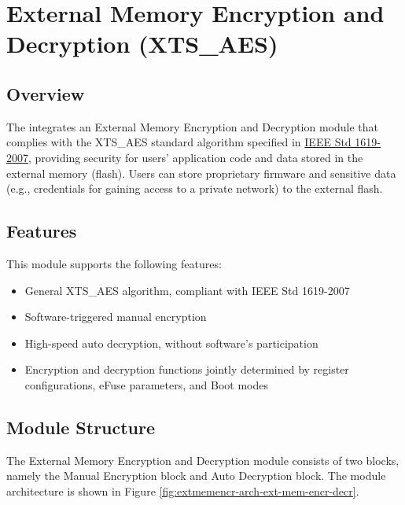 \documentclass[main\_\_EN.tex]{subfiles}
\begin{document}

\ifglobal
\else
    {\let\clearpage\relax \listoftodos}
    {\let\clearpage\relax \listofdonetodos}
    \tableofcontents
\fi



\hypertarget{extmemencr}{}
\chapter{External Memory Encryption and Decryption (XTS\_AES)}
\label{mod:extmemencr}

\section{Overview}

The \chipname{} integrates an External Memory Encryption and Decryption module that complies with the XTS\_AES standard algorithm specified in \href{https://ieeexplore.ieee.org/document/4493450}{IEEE Std 1619-2007}, providing security for users' application code and data stored in the external memory (flash). Users can store proprietary firmware and sensitive data (e.g., credentials for gaining access to a private network) to the external flash.

\section{Features}

This module supports the following features:

\begin{itemize}
    \item General XTS\_AES algorithm, compliant with IEEE Std 1619-2007
    \item Software-triggered manual encryption
    \item High-speed auto decryption, without software's participation
    \item Encryption and decryption functions jointly determined by register configurations, eFuse parameters, and Boot modes
\end{itemize}


\section{Module Structure}
The External Memory Encryption and Decryption module consists of two blocks, namely the Manual Encryption block and Auto Decryption block. The module architecture is shown in Figure \ref{fig:extmemencr-arch-ext-mem-encr-decr}.
\end{document}
